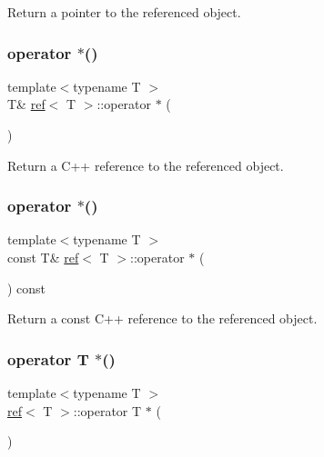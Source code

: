 Return a pointer to the referenced object. 

\mbox{\label{classref_a38e0c7c7edd142e8f57365866060c64a}} 
\subsubsection{\texorpdfstring{operator $\ast$()}{operator *()}\hspace{0.1cm}{\footnotesize\ttfamily [1/2]}}
{\footnotesize\ttfamily template$<$typename T $>$ \\
T\& \mbox{\hyperlink{classref}{ref}}$<$ T $>$\+::operator $\ast$ (\begin{DoxyParamCaption}{ }\end{DoxyParamCaption})\hspace{0.3cm}{\ttfamily [inline]}}



Return a C++ reference to the referenced object. 

\mbox{\label{classref_a600454c0804772ec0b144ebddcfce263}} 
\subsubsection{\texorpdfstring{operator $\ast$()}{operator *()}\hspace{0.1cm}{\footnotesize\ttfamily [2/2]}}
{\footnotesize\ttfamily template$<$typename T $>$ \\
const T\& \mbox{\hyperlink{classref}{ref}}$<$ T $>$\+::operator $\ast$ (\begin{DoxyParamCaption}{ }\end{DoxyParamCaption}) const\hspace{0.3cm}{\ttfamily [inline]}}



Return a const C++ reference to the referenced object. 

\mbox{\label{classref_a67b4f9ea37f8b63ea1a6638f228d8b5a}} 
\subsubsection{\texorpdfstring{operator T $\ast$()}{operator T *()}}
{\footnotesize\ttfamily template$<$typename T $>$ \\
\mbox{\hyperlink{classref}{ref}}$<$ T $>$\+::operator T $\ast$ (\begin{DoxyParamCaption}{ }\end{DoxyParamCaption})\hspace{0.3cm}{\ttfamily [inline]}}



